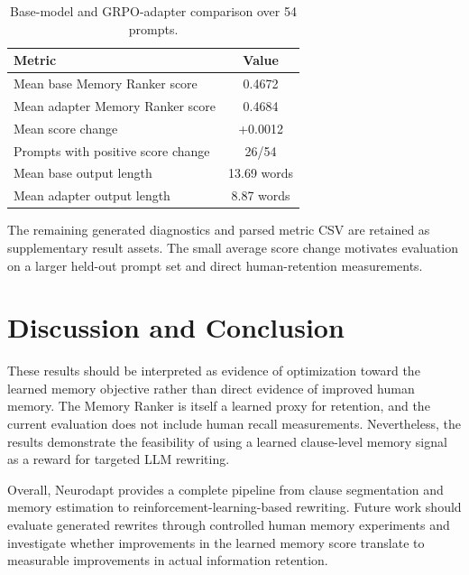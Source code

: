 \documentclass[conference]{IEEEtran}
\renewcommand{\arraystretch}{0.9}
\begin{document}
\begin{table}[H]
\centering
\caption{Base-model and GRPO-adapter comparison over 54 prompts.}
\label{tab:grpo_comparison}
\footnotesize
\renewcommand{\arraystretch}{1.05}
\begin{tabular}{lc}
\hline
\textbf{Metric} & \textbf{Value} \\
\hline
Mean base Memory Ranker score & 0.4672 \\
Mean adapter Memory Ranker score & 0.4684 \\
Mean score change & +0.0012 \\
Prompts with positive score change & 26/54 \\
Mean base output length & 13.69 words \\
Mean adapter output length & 8.87 words \\
\hline
\end{tabular}
\end{table}



The remaining generated diagnostics and parsed metric CSV are retained as supplementary result assets. The small average score change motivates evaluation on a larger held-out prompt set and direct human-retention measurements.

\section{Discussion and Conclusion}


These results should be interpreted as evidence of optimization toward the learned memory objective rather than direct evidence of improved human memory. The Memory Ranker is itself a learned proxy for retention, and the current evaluation does not include human recall measurements. Nevertheless, the results demonstrate the feasibility of using a learned clause-level memory signal as a reward for targeted LLM rewriting.

Overall, Neurodapt provides a complete pipeline from clause segmentation and memory estimation to reinforcement-learning-based rewriting. Future work should evaluate generated rewrites through controlled human memory experiments and investigate whether improvements in the learned memory score translate to measurable improvements in actual information retention.
\end{document}
